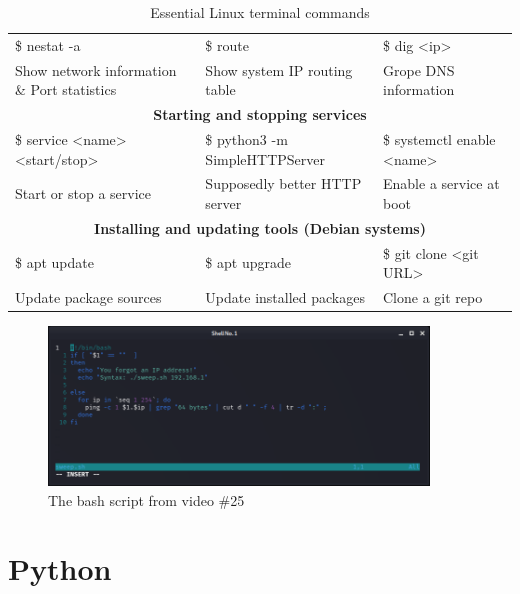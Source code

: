 \documentclass[a4paper,11pt]{article}
\renewcommand{\tt}[2][tt]{\textcolor{#1}{\ttfamily #2}}%
\begin{document}
\begin{table}[h]
\begin{adjustbox}{width=1\textwidth}
\begin{tabular}{|l|l|l|}
        \\
        \hline
        \tt{\$ nestat -a} & \tt{\$ route} & \tt{\$ dig <ip>}
        \\
        Show network information \& Port statistics & Show system IP routing table & Grope DNS information
        \\
        \hline
        \multicolumn{3}{|c|}{\bf{Starting and stopping services}}
        \\
        \hline
        \tt{\$ service <name> <start/stop>} & \tt{\$ python3 -m SimpleHTTPServer} & \tt{\$ systemctl enable <name>}
        \\
        Start or stop a service & Supposedly better HTTP server & Enable a service at boot
        \\
        \hline
        \multicolumn{3}{|c|}{\bf{Installing and updating tools (Debian systems)}}
        \\
        \hline
        \tt{\$ apt update} & \tt{\$ apt upgrade} & \tt{\$ git clone <git URL>}
        \\
        Update package sources & Update installed packages & Clone a git repo
        \\
        \hline
    \end{tabular}
    \end{adjustbox}
    \caption{Essential Linux terminal commands}
    \label{fig:mustknow}
\end{table}
\pagebreak
\begin{figure}[h]
    \centering
    \includegraphics[width=0.9\textwidth]{images/bashsample.png}
    \caption{The bash script from video \#25}
    \label{fig:bash}
\end{figure}


\section{Python}
\end{document}
